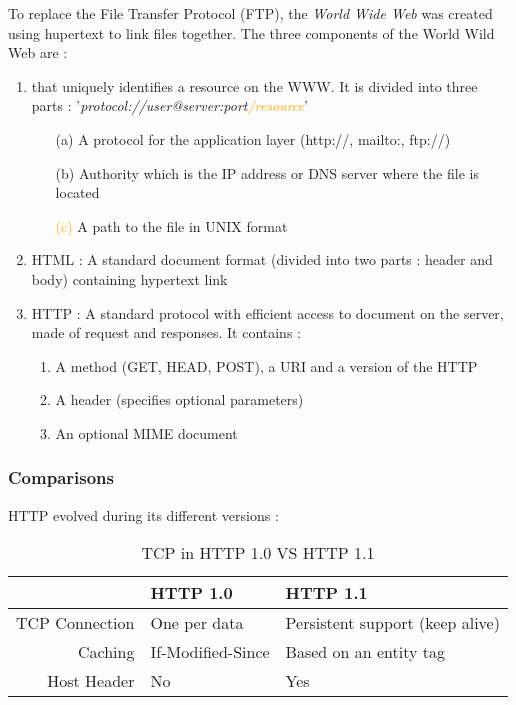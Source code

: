 To replace the File Transfer Protocol (FTP), the \textit{World Wide Web} was created using hupertext to link files together. The three components of the World Wild Web are :
\begin{enumerate}
\item {} that uniquely identifies a resource on the WWW. It is divided into three parts : '\textit{\textcolor{deepGreen}{protocol://}\textcolor{deepBlue}{user@server:port}\textcolor{orange}{/resource}}'
	\begin{enumerate}
	\item[\textcolor{deepGreen}{(a)}] A protocol for the application layer (http://, mailto:, ftp://)
	\item[\textcolor{deepBlue}{(b)}] Authority which is the IP address or DNS server where the file is located
	\item[\textcolor{orange}{(c)}] A path to the file in UNIX format
	\end{enumerate}
\item HTML : A standard document format (divided into two parts : header and body) containing hypertext link
\item HTTP : A standard protocol with efficient access to document on the server, made of request and responses. It contains :
	\begin{enumerate}
	\item A method (GET, HEAD, POST), a URI and a version of the HTTP
	\item A header (specifies optional parameters)
	\item An optional MIME document 
	\end{enumerate}
\end{enumerate}

\subsubsection{Comparisons}

HTTP evolved during its different versions :

\begin{table}[H]
	\centering
	\begin{tabular}{r|l|l}
	\hline 
	 & HTTP 1.0 & HTTP 1.1 \\ 
	\hline 
	TCP Connection & One per data & Persistent support (keep alive) \\ 
	\hline 
	Caching & If-Modified-Since & Based on an entity tag \\ 
	\hline 
	Host Header & No & Yes \\ 
	\hline 
	\end{tabular}
	\caption{TCP in HTTP 1.0 VS HTTP 1.1}
\end{table}

